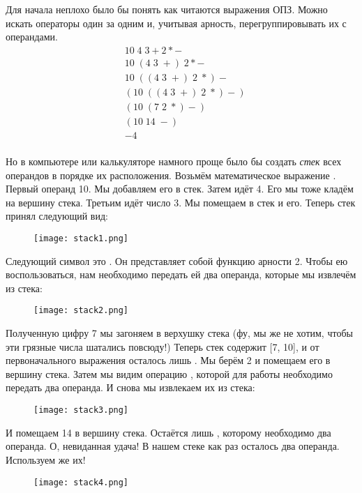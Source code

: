 Для начала неплохо было бы понять как читаются выражения ОПЗ.
Можно искать операторы один за одним и, учитывая арность, перегруппировывать их с операндами.
\begin{align*}
    &10\;4\;3+2 * -\\
    &10\;(4\;3\; +)\;2 * -\\
    &10\; ((4\; 3\; +)\; 2\; *) -\\ 
    &(10\; ((4\; 3\; +)\; 2\; *) -)\\
    &(10\; (7\; 2\; *) -)\\
    &(10\; 14\; -)\\
    &-4\\
\end{align*}

Но в компьютере или калькуляторе намного проще было бы создать \emph{стек} всех операндов в порядке их расположения.
Возьмём математическое выражение .
Первый операнд 10.
Мы добавляем его в стек.
Затем идёт 4.
Его мы тоже кладём на вершину стека.
Третьим идёт число 3.
Мы помещаем в стек и его.
Теперь стек принял следующий вид:
\begin{figure}[h!]
    \centering
    \texttt{[image: stack1.png]}
\end{figure}

Следующий символ это \ops{+\strut}.
Он представляет собой функцию арности 2.
Чтобы ею воспользоваться, нам необходимо  передать ей два операнда, которые мы извлечём из стека:
\begin{figure}[h!]
    \centering
    \texttt{[image: stack2.png]}
\end{figure}

Полученную цифру 7 мы загоняем в верхушку стека (фу, мы же не хотим, чтобы эти грязные числа шатались повсюду!)
Теперь стек содержит [7, 10], и от первоначального выражения осталось лишь .
Мы берём 2 и помещаем его в вершину стека.
Затем мы видим операцию \ops{*\strut}, которой для работы необходимо передать два операнда.
И снова мы извлекаем их из стека:
\begin{figure}[h!]
    \centering
    \texttt{[image: stack3.png]}
\end{figure}

И помещаем 14 в вершину стека.
Остаётся лишь \ops{-\strut}, которому необходимо два операнда.
О, невиданная удача!
В нашем стеке как раз осталось два операнда.
Используем же их!
\begin{figure}[h!]
    \centering
    \texttt{[image: stack4.png]}
\end{figure}

